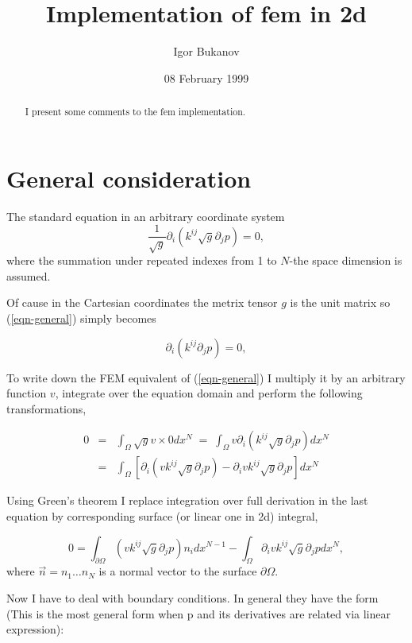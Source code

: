 \documentclass{article}
\title{Implementation of fem in 2d}
\author {Igor Bukanov}
\date { 08 February 1999 }
\def\eqnl#1#2{\begin{equation}\label{#1}#2\end{equation}}
\def\eqnm#1{\begin{eqnarray*}#1\end{eqnarray*}}
\def\rf#1{(\ref{#1})}
\def\EQS{\; = \;}
\theoremstyle{marginbreak} \theorembodyfont{\itshape}
\begin{document}
\setlength{\unitlength}{0.01\textwidth}

\begin{abstract}
I present some comments to the fem implementation.
\end{abstract}

\maketitle

\section{General consideration}


The standard equation in an arbitrary coordinate system
\eqnl{eqn-general}{
\frac{1}{\sqrt{g}} \partial_i(k^{ij} \sqrt{g} \partial_j p) = 0,
}
where the summation under repeated indexes from 1 to $N$-the space dimension
is assumed.

Of cause in the Cartesian coordinates the metrix tensor $g$ is the unit matrix
so \rf{eqn-general} simply becomes

\eqnl{eqn-cartesian}{
\partial_i(k^{ij}\partial_j p) = 0,
}

To write down the FEM equivalent of \rf{eqn-general} I multiply it by
an arbitrary function $v$, integrate over the equation domain and
perform the following transformations,

\eqnm{
0 &=& \int_\Omega \sqrt{g} v \times 0 dx^N
  \EQS \int_\Omega v \partial_i(k^{ij} \sqrt{g} \partial_j p) dx^N \\
  &=&  \int_\Omega [\partial_i (v k^{ij} \sqrt{g} \partial_j p)
                   - \partial_i v k^{ij} \sqrt{g} \partial_j p] dx^N
}

Using Green's  theorem I replace integration over full derivation in the
last equation by corresponding surface (or linear one in 2d) integral,

\begin{equation} \label{femfprm-general}
0 = \int_{\partial\Omega} (v k^{ij} \sqrt{g} \partial_j p) n_i dx^{N-1}
  - \int_\Omega \partial_i v k^{ij} \sqrt{g} \partial_j p dx^N,
\end{equation}
where $\vec{n} = n_1 \dots n_N$ is a normal vector to the  surface
$\partial\Omega$.

Now I have to deal with boundary conditions. In general they have the form
(This is the most general form when p and its derivatives are related via
linear expression):
\end{document}
